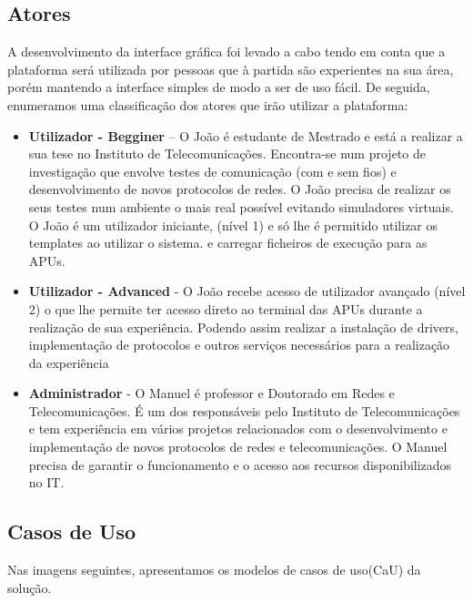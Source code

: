 \subsection{Atores}
A desenvolvimento da interface gráfica foi levado a cabo tendo em conta que a plataforma será utilizada por pessoas que à partida são experientes na sua área, porém mantendo a interface simples de modo a ser de uso fácil. De seguida, enumeramos uma classificação dos atores que irão utilizar a plataforma:
\begin{itemize}
    \item \textbf{Utilizador - Begginer}  – O João é estudante de Mestrado e está a realizar a sua tese no Instituto de Telecomunicações. Encontra-se num projeto de investigação que envolve testes de comunicação (com e sem fios) e desenvolvimento de novos protocolos de redes.\newline 
    O João precisa de realizar os seus testes num ambiente o mais real possível evitando simuladores virtuais. \newline
    O João é um utilizador iniciante, (nível 1) e só lhe é permitido utilizar os templates ao utilizar o sistema. e carregar ficheiros de execução para as APUs.
    \item \textbf{Utilizador - Advanced}  - O João recebe acesso de utilizador avançado (nível 2) o que lhe permite ter acesso direto ao terminal das APUs durante a realização de sua experiência. Podendo assim realizar a instalação de drivers, implementação de protocolos e outros serviços necessários para a realização da experiência
    \item \textbf{Administrador} - O Manuel é professor e Doutorado em Redes e Telecomunicações. É um dos responsáveis pelo Instituto de Telecomunicações e tem experiência em vários projetos relacionados com o desenvolvimento e implementação de novos protocolos de redes e telecomunicações.\newline
    O Manuel precisa de garantir o funcionamento e o acesso aos recursos disponibilizados no IT. 
\end{itemize}

\subsection{Casos de Uso}
Nas imagens seguintes, apresentamos os modelos de casos de uso(CaU) da solução. 
